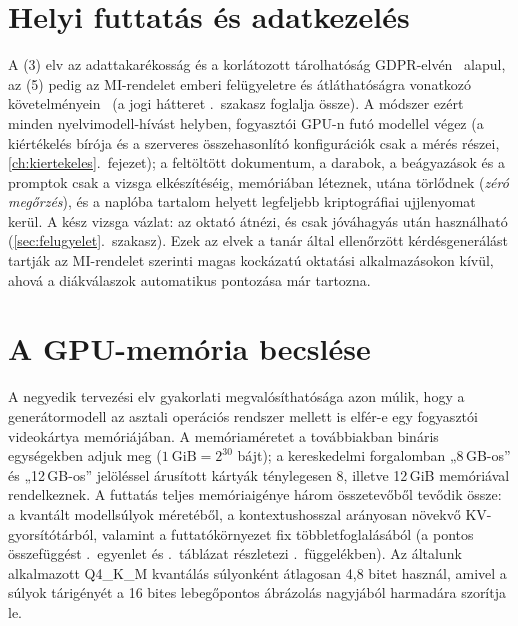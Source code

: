 \section{Helyi futtatás és adatkezelés}
\label{sec:zero}

A (3) elv az adattakarékosság és a korlátozott tárolhatóság GDPR-elvén~\cite{gdpr2016} alapul, az (5) pedig az
MI-rendelet emberi felügyeletre és átláthatóságra vonatkozó követelményein~\cite{aiact2024} (a jogi
hátteret \az{\ref{sec:irod-jog}}.~szakasz foglalja össze). A módszer ezért minden nyelvimodell-hívást
helyben, fogyasztói GPU-n futó modellel végez (a kiértékelés bírója és a szerveres összehasonlító
konfigurációk csak a mérés részei, \ref{ch:kiertekeles}.~fejezet); a feltöltött dokumentum, a darabok, a beágyazások és a
promptok csak a vizsga elkészítéséig, memóriában léteznek, utána törlődnek (\emph{zéró megőrzés}), és a
naplóba tartalom helyett legfeljebb kriptográfiai ujjlenyomat kerül. A kész vizsga vázlat: az oktató
átnézi, és csak jóváhagyás után használható (\ref{sec:felugyelet}.~szakasz). Ezek az elvek a tanár által
ellenőrzött kérdésgenerálást tartják az MI-rendelet szerinti magas kockázatú oktatási alkalmazásokon
kívül, ahová a diákválaszok automatikus pontozása már tartozna.

\section{A GPU-memória becslése}
\label{sec:vram}

A negyedik tervezési elv gyakorlati megvalósíthatósága azon múlik, hogy a generátormodell az asztali
operációs rendszer mellett is elfér-e egy fogyasztói videokártya memóriájában. A memóriaméretet a
továbbiakban bináris egységekben adjuk meg ($1\ \text{GiB}=2^{30}$ bájt); a kereskedelmi forgalomban
„8\,GB-os” és „12\,GB-os” jelöléssel árusított kártyák ténylegesen 8, illetve 12\,GiB memóriával
rendelkeznek. A futtatás teljes memóriaigénye három összetevőből tevődik össze: a kvantált modellsúlyok
méretéből, a kontextushosszal arányosan növekvő KV-gyorsítótárból, valamint a futtatókörnyezet fix
többletfoglalásából (a pontos összefüggést \az{\ref{eq:vram}}.~egyenlet és \az{\ref{tab:budget}}.~táblázat
részletezi \az{\ref{app-vram}}.~függelékben). Az általunk alkalmazott Q4\_K\_M kvantálás súlyonként
átlagosan 4,8 bitet használ, amivel a súlyok tárigényét a 16 bites lebegőpontos ábrázolás nagyjából
harmadára szorítja le.


